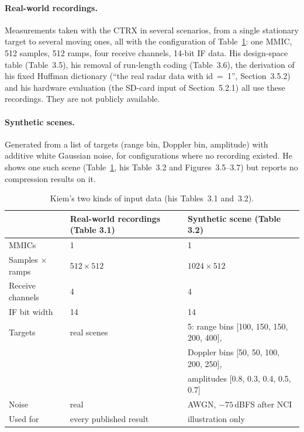 \paragraph{Real-world recordings.} Measurements taken with the CTRX in several
scenarios, from a single stationary target to several moving ones, all with the
configuration of Table~\ref{tab:kiem_data}: one MMIC, 512 samples, 512 ramps,
four receive channels, 14-bit IF data. His design-space table (Table~3.5), his
removal of run-length coding (Table~3.6), the derivation of his fixed Huffman
dictionary (``the real radar data with id~=~1'', Section~3.5.2) and his hardware
evaluation (the SD-card input of Section~5.2.1) all use these recordings. They
are not publicly available.

\paragraph{Synthetic scenes.} Generated from a list of targets (range bin,
Doppler bin, amplitude) with additive white Gaussian noise, for configurations
where no recording existed. He shows one such scene (Table~\ref{tab:kiem_data},
his Table~3.2 and Figures~3.5--3.7) but reports no compression results on it.

\begin{table}[htbp]
\centering
\caption[Kiem's data]{Kiem's two kinds of input data (his Tables~3.1
and~3.2).}
\label{tab:kiem_data}
\small
\begin{tabular}{@{}lll@{}}
\toprule
& Real-world recordings (Table 3.1) & Synthetic scene (Table 3.2)\\
\midrule
MMICs & 1 & 1\\
Samples $\times$ ramps & $512 \times 512$ & $1024 \times 512$\\
Receive channels & 4 & 4\\
IF bit width & 14 & 14\\
Targets & real scenes & 5: range bins [100, 150, 150, 200, 400],\\
& & Doppler bins [50, 50, 100, 200, 250],\\
& & amplitudes [0.8, 0.3, 0.4, 0.5, 0.7]\\
Noise & real & AWGN, $-75$\,dBFS after NCI\\
Used for & every published result & illustration only\\
\bottomrule
\end{tabular}
\end{table}

